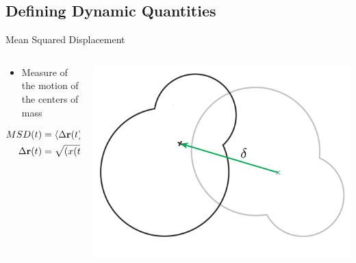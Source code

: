 \documentclass[16pt, aspectratio=43,compress]{beamer}
\begin{document}
\subsection{Defining Dynamic Quantities}

\begin{frame}{Mean Squared Displacement}
    \begin{columns}
        \begin{column}{0.5\linewidth}
            \begin{itemize}
                \item Measure of the motion of the centers of mass
            \end{itemize}
            \begin{align*}
                 MSD(t) &= \langle \Delta \mathbf{r}(t)^2 \rangle,\\
                 \Delta \mathbf{r}(t) &= \sqrt{(x(t) - x_0)^2 + (y(t) - y_0)^2}
            \end{align*}
        \end{column}
        \begin{column}{0.5\linewidth}
            \includegraphics[width=\textwidth]{msd}
        \end{column}
    \end{columns}
\end{frame}
\end{document}
